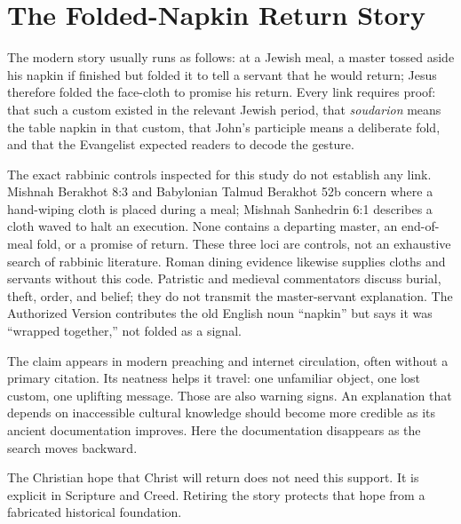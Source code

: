 \section{The Folded-Napkin Return Story}

The modern story usually runs as follows: at a Jewish meal, a master tossed
aside his napkin if finished but folded it to tell a servant that he would
return; Jesus therefore folded the face-cloth to promise his return. Every link
requires proof: that such a custom existed in the relevant Jewish period, that
\emph{soudarion} means the table napkin in that custom, that John's participle
means a deliberate fold, and that the Evangelist expected readers to decode
the gesture.

The exact rabbinic controls inspected for this study do not establish any
link. Mishnah Berakhot 8:3 and Babylonian Talmud Berakhot 52b concern where a
hand-wiping cloth is placed during a meal; Mishnah Sanhedrin 6:1 describes a
cloth waved to halt an execution. None contains a departing master, an
end-of-meal fold, or a promise of return. These three loci are controls, not an
exhaustive search of rabbinic literature. Roman dining evidence likewise
supplies cloths and servants without this code. Patristic and medieval
commentators discuss burial, theft, order, and belief; they do not transmit the
master-servant explanation. The Authorized Version contributes the old English
noun ``napkin'' but says it was ``wrapped together,'' not folded as a signal.

The claim appears in modern preaching and internet circulation, often without
a primary citation. Its neatness helps it travel: one unfamiliar object, one
lost custom, one uplifting message. Those are also warning signs. An explanation
that depends on inaccessible cultural knowledge should become more credible as
its ancient documentation improves. Here the documentation disappears as the
search moves backward.

The Christian hope that Christ will return does not need this support. It is
explicit in Scripture and Creed. Retiring the story protects that hope from a
fabricated historical foundation.

